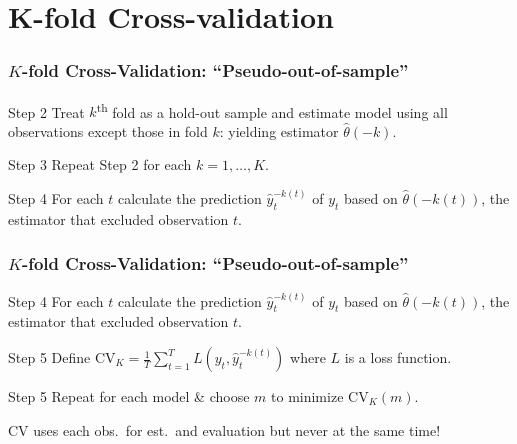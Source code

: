 \section{K-fold Cross-validation}
\begin{frame}
  \frametitle{$K$-fold Cross-Validation: ``Pseudo-out-of-sample''}

  \begin{block}{Step 2}
    Treat $k$\textsuperscript{th} fold as a hold-out sample and estimate model using all observations \alert{except} those in fold $k$: yielding estimator $\widehat{\theta}(-k)$.
  \end{block}

  \pause
  \begin{block}{Step 3}
    Repeat Step 2 for each $k = 1, \dots, K$. 
  \end{block}

  \begin{block}{Step 4}
    For each $t$ calculate the prediction $\widehat{y}_t^{-k(t)}$ of $y_t$ based on $\widehat{\theta}(-k(t))$, the estimator that excluded observation $t$. 
  \end{block}

\end{frame}
\begin{frame}
  \frametitle{$K$-fold Cross-Validation: ``Pseudo-out-of-sample''}

  \begin{block}{Step 4}
    For each $t$ calculate the prediction $\widehat{y}_t^{-k(t)}$ of $y_t$ based on $\widehat{\theta}(-k(t))$, the estimator that excluded observation $t$. 
  \end{block}

  \pause

  \begin{block}{Step 5}
    Define $\text{CV}_K = \frac{1}{T}\sum_{t=1}^T L\left(y_t, \widehat{y}_t^{-k(t)}\right)$ where $L$ is a loss function. 
  \end{block}

  \pause

  \begin{block}{Step 5}
    Repeat for each model \& choose $m$ to minimize $\text{CV}_K(m)$.
  \end{block}

  \alert{CV uses each obs.\ for est.\ and evaluation but never at the same time!}

\end{frame}

